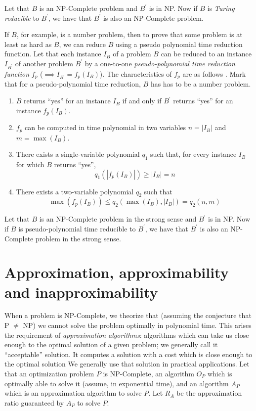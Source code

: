 \begin{lemma}\label{lemma:ptr-npc}
Let that $B$ is an NP-Complete problem and $B^\prime$ is in NP. Now if $B$ is \textit{Turing reducible} to $B^\prime$, we have that $B^\prime$ is also an NP-Complete problem.\cite{Garey1979}
\end{lemma}

If $B$, for example, is a number problem, then to prove that some problem is at least as hard as $B$, we can reduce $B$ using a pseudo polynomial time reduction function. Let that each instance $I_B$ of a problem $B$ can be reduced to an instance $I_{B^\prime}$ of another problem $B^\prime$ by a one-to-one \textit{pseudo-polynomial time reduction function} $f_p$ ($\implies I_{B^\prime}=f_p(I_B)$). The characteristics of $f_p$ are as follows \cite{Garey1979}. Mark that for a pseudo-polynomial time reduction, $B$ has has to be a number problem.
\begin{enumerate}
    \item $B$ returns ``yes'' for an instance $I_B$ if and only if $B^\prime$ returns ``yes'' for an instance $f_p(I_B)$.
    \item $f_p$ can be computed in time polynomial in two variables $n=|I_B|$ and $m=\max(I_B)$.
    \item There exists a single-variable polynomial $q_1$ such that, for every instance $I_B$ for which $B$ returns ``yes'',
    $$q_1(|f_p(I_B)|)\geq |I_B|=n$$
    \item There exists a two-variable polynomial $q_2$ such that
    $$\max(f_p(I_B))\leq q_2(\max(I_B),|I_B|)=q_2(n,m)$$
\end{enumerate}

\begin{lemma}\label{lemma:pptr-npc}
Let that $B$ is an NP-Complete problem in the strong sense and $B^\prime$ is in NP. Now if $B$ is pseudo-polynomial time reducible to $B^\prime$, we have that $B^\prime$ is also an NP-Complete problem in the strong sense.\cite{Garey1979}
\end{lemma}

\section{Approximation, approximability and inapproximability}\label{section:inapproximability-NPH}

When a problem is NP-Complete, we theorize that (assuming the conjecture that P $\neq$ NP) we cannot solve the problem optimally in polynomial time. This arises the requirement of \textit{approximation algorithms}: algorithms which can take us close enough to the optimal solution of a given problem; we generally call it ``acceptable'' solution. It computes a solution with a cost which is close enough to the optimal solution We generally use that solution in practical applications. Let that an optimization problem $P$ is NP-Complete, an algorithm $O_P$ which is optimally able to solve it (assume, in exponential time), and an algorithm $A_P$ which is an approximation algorithm to solve $P$. Let $R_A$ be the approximation ratio guaranteed by $A_P$ to solve $P$.


